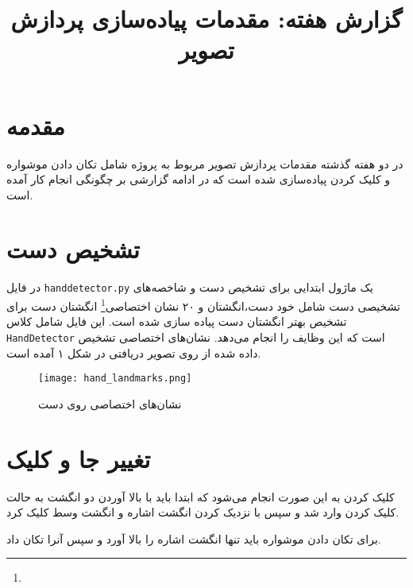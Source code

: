 \documentclass{article}
\title{گزارش هفته: مقدمات پیاده‌سازی پردازش تصویر}
\begin{document}
\heading
\header
\allowdisplaybreaks
\tableofcontents
\pagebreak

\section{مقدمه}
در دو هفته گذشته مقدمات پردازش تصویر مربوط به پروژه شامل تکان دادن موشواره و کلیک کردن پیاده‌سازی شده است که در ادامه گزارشی بر چگونگی انجام کار آمده است.

\section{تشخیص دست}
در فایل \verb!handdetector.py! یک ماژول ابتدایی برای تشخیص دست و شاخصه‌های تشخیصی دست شامل خود دست،‌انگشتان و ۲۰ نشان اختصاصی\footnote{} انگشتان دست برای تشخیص بهتر انگشتان دست
پیاده سازی شده است. این فایل شامل کلاس \verb!HandDetector! است که این وظایف را انجام می‌دهد. نشان‌های اختصاصی تشخیص داده شده از روی تصویر دریافتی در شکل ۱ آمده است.

\begin{figure}
\centering
\texttt{[image: hand\_landmarks.png]}
\caption{نشان‌های اختصاصی روی دست}
\end{figure}

\section{تغییر جا و کلیک}
کلیک کردن به این صورت انجام می‌شود که ابتدا باید با بالا آوردن دو انگشت به حالت کلیک کردن وارد شد و سپس با نزدیک کردن انگشت اشاره و انگشت وسط کلیک کرد.

برای تکان دادن موشواره باید تنها انگشت اشاره را بالا آورد و سپس آنرا تکان داد.
\end{document}
